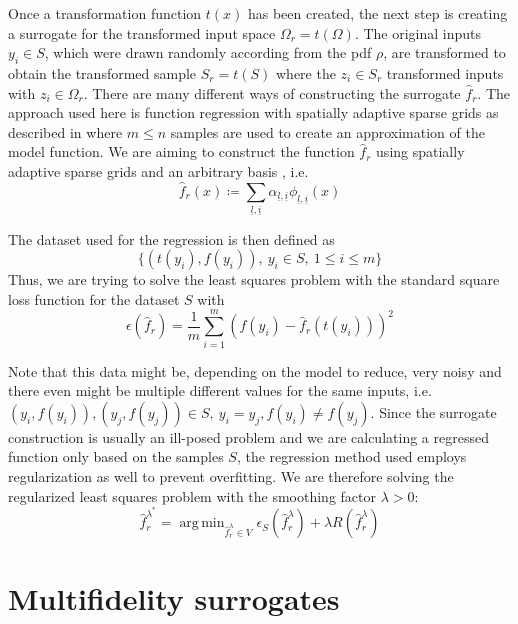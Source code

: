 \documentclass[
  a4paper,  %
  twoside,  %
  bibliography=totoc,
  headsepline,
  cleardoublepage=empty,
  parskip=half,
  draft=false
]{scrbook}
\DeclareMathOperator*{\argmin}{arg\,min}
\begin{document}
Once a transformation function $t(x)$ has been created, the next step is creating a surrogate for the transformed input space $\Omega_r=t(\Omega)$.
The original inputs $y_i \in S$, which were drawn randomly according from the pdf $\rho$, are transformed to obtain the transformed sample $S_r=t(S)$ where the $z_i \in S_r$ transformed inputs with $z_i \in \Omega_r$.
There are many different ways of constructing the surrogate $\hat{f}_r$.
The approach used here is function regression with spatially adaptive sparse grids as described in \cite{P10} where $m \leq n$ samples are used to create an approximation of the model function.
We are aiming to construct the function $\hat{f}_r$ using spatially adaptive sparse grids and an arbitrary basis , i.e.
\begin{equation}
\hat{f}_r(x) \coloneqq \sum_{\underline{l},\underline{i}} \alpha_{\underline{l},\underline{i}} \phi_{\underline{l},\underline{i}}(x)
\end{equation}

The dataset used for the regression is then defined as
\begin{equation}
\{(t(y_i),f(y_i)), ~ y_i \in S, ~ 1 \leq i \leq m\}
\end{equation}
Thus, we are trying to solve the least squares problem with the standard square loss function for the dataset $S$ with
\begin{equation}
\epsilon(\hat{f}_r)=\frac{1}{m} \sum_{i=1}^m (f(y_i) - \hat{f}_r(t(y_i)))^2 
\end{equation}

Note that this data might be, depending on the model to reduce, very noisy and there even might be multiple different values for the same inputs, i.e. $(y_i,f(y_i)), (y_j,f(y_j)) \in S, ~ y_i=y_j, f(y_i) \neq f(y_j)$.
Since the surrogate construction is usually an ill-posed problem and we are calculating a regressed function only based on the samples $S$, the regression method used employs regularization as well to prevent overfitting.
We are therefore solving the regularized least squares problem with the smoothing factor $\lambda > 0$:
\begin{equation}
\hat{f}_r^{\lambda^*} = \argmin_{\hat{f}_r^\lambda \in V} \epsilon_{S}(\hat{f}_r^\lambda) + \lambda R(\hat{f}_r^\lambda)
\end{equation}

\section{Multifidelity surrogates}
\end{document}
